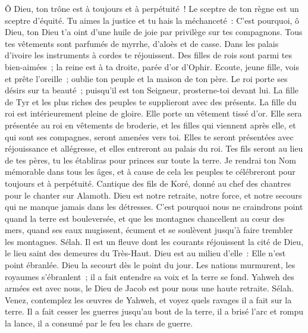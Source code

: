 \begin{multicols}{2}
Ô Dieu, ton trône est à toujours et à perpétuité~! Le sceptre de ton règne est un sceptre d'équité.
Tu aimes la justice et tu hais la méchanceté~: C'est pourquoi, ô Dieu, ton Dieu t'a oint d'une huile de joie par privilège sur tes compagnons.
Tous tes vêtements sont parfumés de myrrhe, d'aloès et de casse. Dans les palais d'ivoire les instruments à cordes te réjouissent.
Des filles de rois sont parmi tes bien-aimées~; la reine est à ta droite, parée d'or d'Ophir.
Ecoute, jeune fille, vois et prête l'oreille~; oublie ton peuple et la maison de ton père.
Le roi porte ses désirs sur ta beauté~; puisqu'il est ton Seigneur, prosterne-toi devant lui.
La fille de Tyr et les plus riches des peuples te supplieront avec des présents.
La fille du roi est intérieurement pleine de gloire. Elle porte un vêtement tissé d'or.
Elle sera présentée au roi en vêtements de broderie, et les filles qui viennent après elle, et qui sont ses compagnes, seront amenées vers toi.
Elles te seront présentées avec réjouissance et allégresse, et elles entreront au palais du roi.
Tes fils seront au lieu de tes pères, tu les établiras pour princes sur toute la terre.
Je rendrai ton Nom mémorable dans tous les âges, et à cause de cela les peuples te célébreront pour toujours et à perpétuité.
\VerseOne{}Cantique des fils de Koré, donné au chef des chantres pour le chanter sur Alamoth. 
Dieu est notre retraite, notre force, et notre secours qui ne manque jamais dans les détresses.
C'est pourquoi nous ne craindrons point quand la terre est bouleversée, et que les montagnes chancellent au cœur des mers,
quand ses eaux mugissent, écument et se soulèvent jusqu'à faire trembler les montagnes. Sélah.
Il est un fleuve dont les courants réjouissent la cité de Dieu, le lieu saint des demeures du Très-Haut.
Dieu est au milieu d'elle~: Elle n'est point ébranlée. Dieu la secourt dès le point du jour.
Les nations murmurent, les royaumes s'ébranlent~; il a fait entendre sa voix et la terre se fond.
Yahweh des armées est avec nous, le Dieu de Jacob est pour nous une haute retraite. Sélah.
Venez, contemplez les œuvres de Yahweh, et voyez quels ravages il a fait sur la terre.
Il a fait cesser les guerres jusqu'au bout de la terre, il a brisé l'arc et rompu la lance, il a consumé par le feu les chars de guerre.

\end{multicols}
